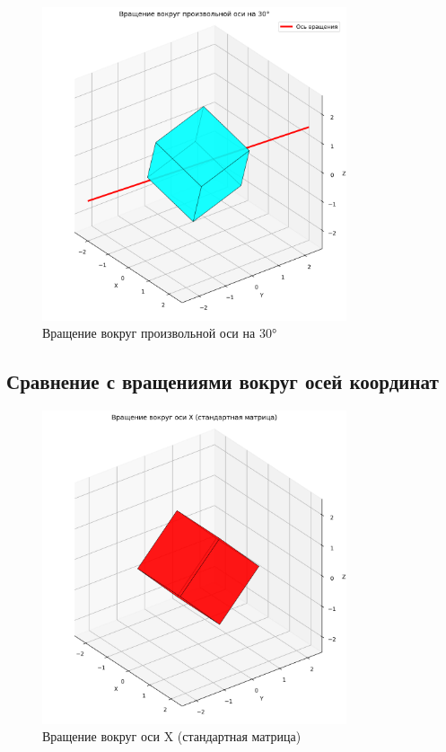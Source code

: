\begin{figure}[H]
\centering
\includegraphics[width=0.8\textwidth]{images/task4/rotate_arbitrary.png}
\caption{Вращение вокруг произвольной оси на 30°}
\end{figure}

\subsection*{Сравнение с вращениями вокруг осей координат}

\begin{figure}[H]
\centering
\includegraphics[width=0.8\textwidth]{images/task4/rotate_x_standard.png}
\caption{Вращение вокруг оси X (стандартная матрица)}
\end{figure}

